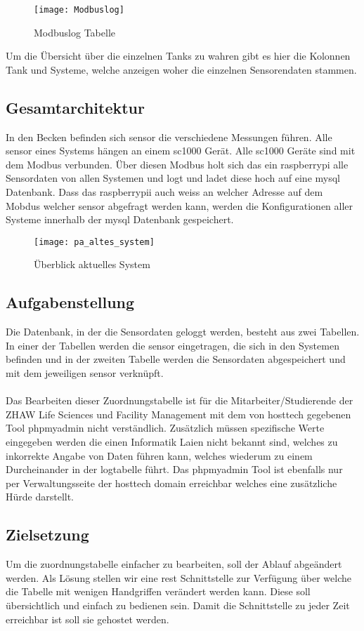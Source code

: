 \documentclass[../main.tex]{subfiles}
\begin{document}
	\begin{figure}[H]
		\centering
		\texttt{[image: Modbuslog]}
		\caption{Modbuslog Tabelle}
		\label{fig:Modbuslog}
	\end{figure}
	\par \noindent	
	Um die Übersicht über die einzelnen Tanks zu wahren gibt es hier die Kolonnen Tank und Systeme, welche anzeigen woher die einzelnen Sensorendaten stammen.
	
	\subsection{Gesamtarchitektur}
	In den Becken befinden sich \gls{sensor} die verschiedene Messungen führen. Alle \gls{sensor} eines Systems hängen an einem \gls{sc1000} Gerät. Alle \gls{sc1000} Geräte sind mit dem Modbus verbunden. Über diesen Modbus holt sich das ein \gls{raspberrypi} alle Sensordaten von allen Systemen und logt und ladet diese hoch auf eine \gls{mysql} Datenbank. Dass das \gls{raspberrypi}i auch weiss an welcher Adresse auf dem Mobdus welcher \gls{sensor} abgefragt werden kann, werden die Konfigurationen aller Systeme innerhalb der \gls{mysql} Datenbank gespeichert.
	\begin{figure}[H]
		\centering
		\texttt{[image: pa\_altes\_system]}
		\caption{Überblick aktuelles System}
		\label{fig:pa_altes_system}
	\end{figure}
	
	\subsection{Aufgabenstellung}
	Die Datenbank, in der die Sensordaten geloggt werden, besteht aus zwei Tabellen. In einer der Tabellen werden die \gls{sensor} eingetragen, die sich in den Systemen befinden und in der zweiten Tabelle werden die Sensordaten abgespeichert und mit dem jeweiligen \gls{sensor} verknüpft. \\
	\\	
	Das Bearbeiten dieser Zuordnungstabelle ist für die Mitarbeiter/Studierende der ZHAW Life Sciences und Facility Management mit dem von \gls{hosttech} gegebenen Tool \gls{phpmyadmin} nicht verständlich. Zusätzlich müssen spezifische Werte eingegeben werden die einen Informatik Laien nicht bekannt sind, welches zu inkorrekte Angabe von Daten führen kann, welches wiederum zu einem Durcheinander in der \gls{logtabelle} führt. 
	Das \gls{phpmyadmin} Tool ist ebenfalls nur per Verwaltungsseite der \gls{hosttech} \gls{domain} erreichbar welches eine zusätzliche Hürde darstellt.
	
	\subsection{Zielsetzung}
	Um die \gls{zuordnungstabelle} einfacher zu bearbeiten, soll der Ablauf abgeändert werden. Als Lösung stellen wir eine \gls{rest} Schnittstelle zur Verfügung über welche die Tabelle mit wenigen Handgriffen verändert werden kann. 
	Diese soll übersichtlich und einfach zu bedienen sein. Damit die Schnittstelle zu jeder Zeit erreichbar ist soll sie gehostet werden.
\end{document}
